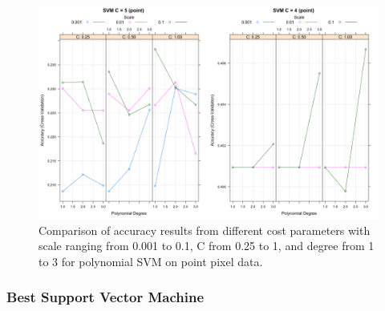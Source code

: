 \documentclass[12pt,twoside]{reedthesis}
\begin{document}
\begin{figure}

{\centering \includegraphics[width=0.9\linewidth]{figure/svm3c} 

}

\caption{Comparison of accuracy results from different cost parameters with scale ranging from 0.001 to 0.1, C from 0.25 to 1, and degree from 1 to 3 for polynomial SVM on point pixel data.}\label{fig:svm3c}
\end{figure}
\hypertarget{best-support-vector-machine}{%
\subsubsection{Best Support Vector Machine}\label{best-support-vector-machine}}
\end{document}

